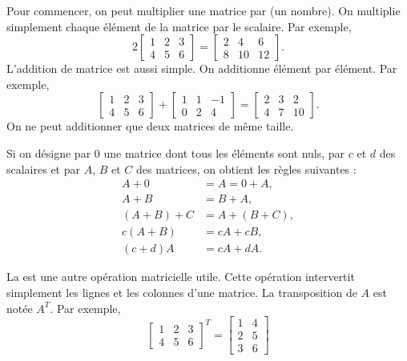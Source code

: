 Pour commencer, on peut multiplier une matrice par  \emph{} (un nombre).
On multiplie simplement chaque élément de la matrice par le scalaire. Par exemple,
\begin{equation*}
2
\begin{bmatrix}
1 & 2 & 3 \\
4 & 5 & 6
\end{bmatrix} =
\begin{bmatrix}
2 & 4 & 6 \\
8 & 10 & 12
\end{bmatrix} .
\end{equation*}
L’addition de matrice est aussi simple. On additionne élément par élément. Par exemple,
\begin{equation*}
\begin{bmatrix}
1 & 2 & 3 \\
4 & 5 & 6
\end{bmatrix} +
\begin{bmatrix}
1 & 1 & -1 \\
0 & 2 & 4
\end{bmatrix}
=
\begin{bmatrix}
2 & 3 & 2 \\
4 & 7 & 10
\end{bmatrix} .
\end{equation*}
On ne peut additionner que deux matrices de même taille.

Si on désigne par 0 une matrice dont tous les éléments sont nuls, par
$c$ et $d$ des scalaires et par $A$, $B$ et $C$ des matrices, on obtient les règles suivantes :
\begin{align*}
A + 0 & = A = 0 + A , \\
A + B & = B + A , \\
(A + B) + C & = A + (B + C) , \\
c(A+B) & = cA+cB, \\
(c+d)A & = cA + dA.
\end{align*}

La \emph{} est une autre opération matricielle utile. Cette opération intervertit simplement les lignes et les colonnes d’une matrice. La transposition de $A$ est notée $A^T$. Par exemple,
\begin{equation*}
\begin{bmatrix}
1 & 2 & 3 \\
4 & 5 & 6
\end{bmatrix}^T =
\begin{bmatrix}
1 & 4 \\
2 & 5 \\
3 & 6 
\end{bmatrix}
\end{equation*}

